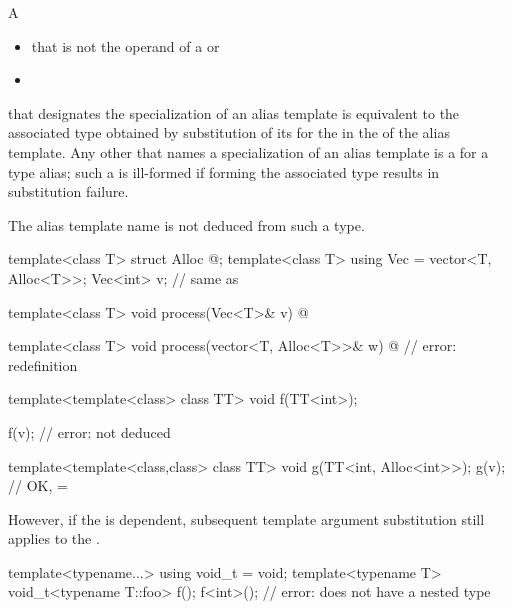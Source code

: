 \pnum
A
\begin{itemize}
\item
{}
that is not the operand of a  or
\item
{}
\end{itemize}
that designates the specialization of
an alias template is equivalent to the associated type obtained by
substitution of its  for the
 in the  of
the alias template.
Any other 
that names a specialization of an alias template is
a  for a type alias;
such a  is ill-formed if
forming the associated type results in substitution failure.
\begin{note}
The alias template name is not deduced from such a type.
\end{note}
\begin{example}
\begin{codeblock}
template<class T> struct Alloc { @\commentellip@ };
template<class T> using Vec = vector<T, Alloc<T>>;
Vec<int> v;         // same as 

template<class T>
  void process(Vec<T>& v)
  { @\commentellip@ }

template<class T>
  void process(vector<T, Alloc<T>>& w)
  { @\commentellip@ }     // error: redefinition

template<template<class> class TT>
  void f(TT<int>);

f(v);               // error:  not deduced

template<template<class,class> class TT>
  void g(TT<int, Alloc<int>>);
g(v);               // OK,  = 
\end{codeblock}

\end{example}

\pnum
However, if the  is dependent, subsequent template
argument substitution still applies to the .
\begin{example}
\begin{codeblock}
template<typename...> using void_t = void;
template<typename T> void_t<typename T::foo> f();
f<int>();           // error:  does not have a nested type 
\end{codeblock}
\end{example}

